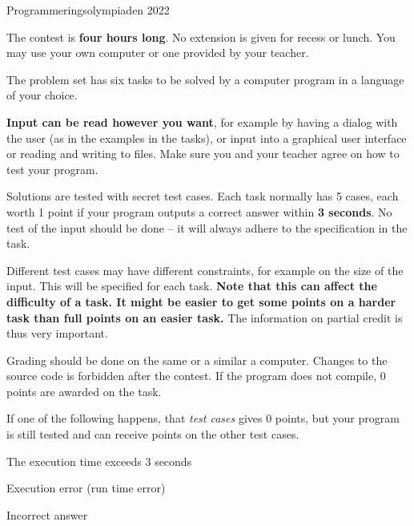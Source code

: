 
\thispagestyle{fancy}
\lstset{basicstyle=\ttfamily,
  breaklines=true}

\begin{center}
\Huge{Programmeringsolympiaden 2022}
\end{center}
\vspace{-1.2cm} 
\begin{lista}
\item The contest is \textbf{four hours long}.
  No extension is given for recess or lunch.
  You may use your own computer or one provided by your teacher.
\item The problem set has six tasks to be solved by a computer program in a language of your choice.
\item {\bf Input can be read however you want}, for example by having a dialog with the user (as in the examples in the tasks), or input into a graphical user interface or reading and writing to files. Make sure you and your teacher agree on how to test your program.
\item Solutions are tested with secret test cases.
  Each task normally has 5 cases, each worth 1 point if your program outputs a correct answer within \textbf{3 seconds}.
  No test of the input should be done -- it will always adhere to the specification in the task.
\item Different test cases may have different constraints, for example on the size of the input.
  This will be specified for each task.
  \textbf{Note that this can affect the difficulty of a task.
  It might be easier to get some points on a harder task than full points on an easier task.}
  The information on partial credit is thus very important.
\item Grading should be done on the same or a similar a computer.
  Changes to the source code is forbidden after the contest.
  If the program does not compile, 0 points are awarded on the task.
\item If one of the following happens, that 
  {\em test cases} gives 0 points, but your program is still tested and can receive points on the other test cases.
\begin{lista}
\item The execution time exceeds 3 seconds \vspace{-0.2cm}
\item Execution error (run time error) \vspace{-0.2cm}
\item Incorrect answer \vspace{-0.2cm}
\end{lista}


\end{lista}

